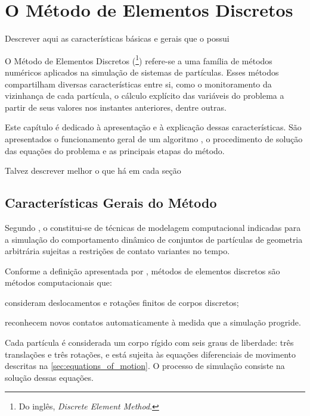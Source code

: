 \chapter{O Método de Elementos Discretos} \label{ch:discrete_element_method}

\alert{Descrever aqui as características básicas e gerais que o \DEM{} possui}

O Método de Elementos Discretos (\DEM{}\footnote{Do inglês, \textit{Discrete Element Method}.}) refere-se a uma família de métodos numéricos aplicados na simulação de sistemas de partículas. Esses métodos compartilham diversas características entre si, como o monitoramento da vizinhança de cada partícula, o cálculo explícito das variáveis do problema a partir de seus valores nos instantes anteriores, dentre outras.

Este capítulo é dedicado à apresentação e à explicação dessas características. São apresentados o funcionamento geral de um algoritmo \DEM{}, o procedimento de solução das equações do problema e as principais etapas do método.

\alert{Talvez descrever melhor o que há em cada seção}

\section{Características Gerais do Método}

Segundo , o \DEM{} constitui-se de técnicas de modelagem computacional indicadas para a simulação do comportamento dinâmico de conjuntos de partículas de geometria arbitrária sujeitas a restrições de contato variantes no tempo.

Conforme a definição apresentada por , métodos de elementos discretos são métodos computacionais que:
\begin{alineas}
	\item consideram deslocamentos e rotações finitos de corpos discretos;
	\item reconhecem novos contatos automaticamente à medida que a simulação progride.
\end{alineas}

Cada partícula é considerada um corpo rígido com seis graus de liberdade: três translações e três rotações, e está sujeita às equações diferenciais de movimento descritas na \cref{sec:equations_of_motion}. O processo de simulação consiste na solução dessas equações. 

